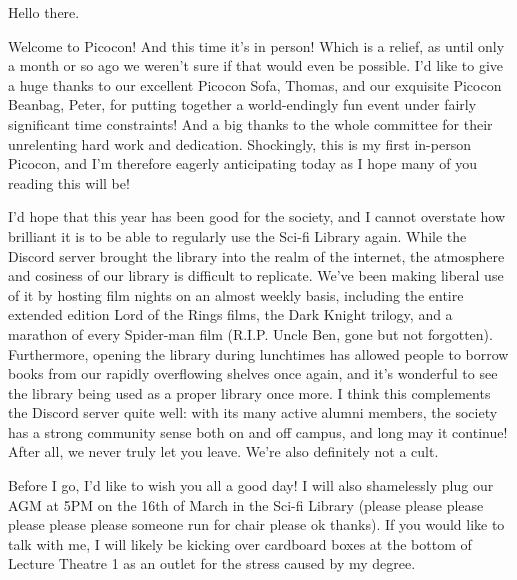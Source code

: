 Hello there.

Welcome to Picocon! And this time it’s in person! Which is a relief, as until only a month or so ago we weren’t sure if that would even be possible. I’d like to give a huge thanks to our excellent Picocon Sofa, Thomas, and our exquisite Picocon Beanbag, Peter, for putting together a world-endingly fun event under fairly significant time constraints! And a big thanks to the whole committee for their unrelenting hard work and dedication. Shockingly, this is my first in-person Picocon, and I’m therefore eagerly anticipating today as I hope many of you reading this will be!

I’d hope that this year has been good for the society, and I cannot overstate how brilliant it is to be able to regularly use the Sci-fi Library again. While the Discord server brought the library into the realm of the internet, the atmosphere and cosiness of our library is difficult to replicate. We’ve been making liberal use of it by hosting film nights on an almost weekly basis, including the entire extended edition Lord of the Rings films, the Dark Knight trilogy, and a marathon of every Spider-man film (R.I.P. Uncle Ben, gone but not forgotten). Furthermore, opening the library during lunchtimes has allowed people to borrow books from our rapidly overflowing shelves once again, and it’s wonderful to see the library being used as a proper library once more. I think this complements the Discord server quite well: with its many active alumni members, the society has a strong community sense both on and off campus, and long may it continue! After all, we never truly let you leave. We’re also definitely not a cult.

Before I go, I’d like to wish you all a good day! I will also shamelessly plug our AGM at 5PM on the 16th of March in the Sci-fi Library (please please please please please please someone run for chair please ok thanks). If you would like to talk with me, I will likely be kicking over cardboard boxes at the bottom of Lecture Theatre 1 as an outlet for the stress caused by my degree.